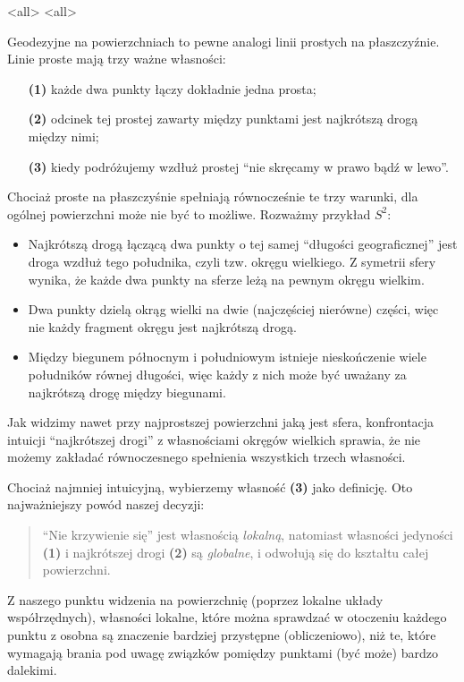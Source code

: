 \mode*
\mode<all>{}
\mode<all>{}
\begin{frame}[<+->]
Geodezyjne na powierzchniach to pewne analogi linii prostych na płaszczyźnie. Linie proste mają trzy ważne własności:
\begin{itemize}
\item [\textbf{(1)}]każde dwa punkty łączy dokładnie jedna prosta;
\item [\textbf{(2)}]odcinek tej prostej zawarty między punktami jest najkrótszą drogą między nimi;
\item [\textbf{(3)}]kiedy podróżujemy wzdłuż prostej ``nie skręcamy w prawo bądź w lewo''.
\end{itemize}
\end{frame}
\begin{frame}

Chociaż proste na płaszczyśnie spełniają równocześnie te trzy warunki, dla ogólnej powierzchni może nie być to możliwe. Rozważmy przykład $S^2$:
\begin{itemize}
\pause\item Najkrótszą drogą łączącą dwa punkty o tej samej ``długości geograficznej'' jest droga wzdłuż tego południka, czyli tzw. okręgu wielkiego. Z symetrii sfery wynika, że każde dwa punkty na sferze leżą na pewnym okręgu wielkim.
\pause\item Dwa punkty dzielą okrąg wielki na dwie (najczęściej nierówne) części, więc nie każdy fragment okręgu jest najkrótszą drogą.
\pause\item Między biegunem północnym i południowym istnieje nieskończenie wiele południków równej długości, więc każdy z nich może być uważany za najkrótszą drogę między biegunami.
\end{itemize}

\end{frame}
Jak widzimy nawet przy najprostszej powierzchni jaką jest sfera, konfrontacja intuicji ``najkrótszej drogi'' z własnościami okręgów wielkich sprawia, że nie możemy zakładać równoczesnego spełnienia wszystkich trzech własności.  

\begin{frame}[<+->]
Chociaż najmniej intuicyjną, wybierzemy własność \textbf{(3)} jako definicję. Oto najważniejszy powód naszej decyzji: 
\begin{quote}
``Nie krzywienie się'' jest własnością \textit{lokalną}, natomiast własności jedyności \textbf{(1)} i najkrótszej drogi \textbf{(2)} są \textit{globalne}, i odwołują się do kształtu całej powierzchni.
\end{quote}


\end{frame}
Z naszego punktu widzenia na powierzchnię (poprzez lokalne układy współrzędnych), własności lokalne, które można sprawdzać w otoczeniu każdego punktu z osobna są znaczenie bardziej przystępne (obliczeniowo), niż te, które wymagają brania pod uwagę związków pomiędzy punktami (być może) bardzo dalekimi.

